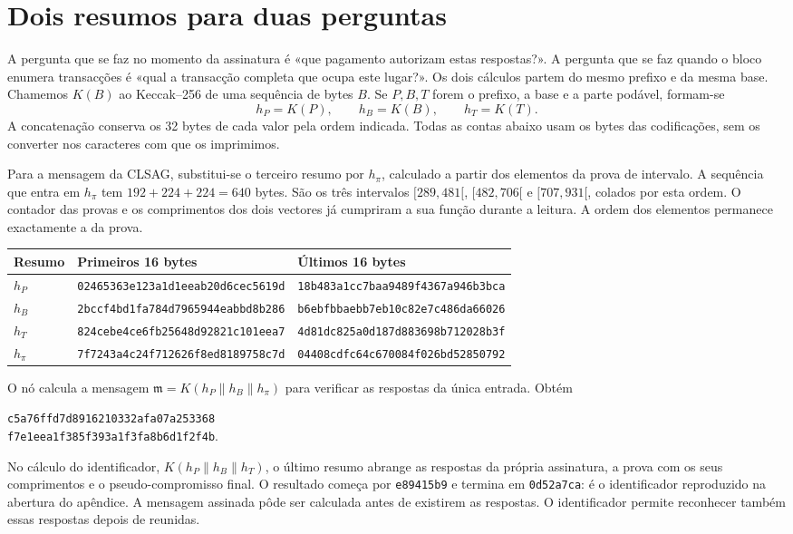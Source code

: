 \section{Dois resumos para duas perguntas}

A pergunta que se faz no momento da assinatura é «que pagamento
autorizam estas respostas?». A pergunta que se faz quando o bloco
enumera transacções é «qual a transacção completa que ocupa este
lugar?». Os dois cálculos partem do mesmo prefixo e da mesma base.
Chamemos \(K(B)\) ao Keccak--256 de uma sequência de bytes \(B\).
Se \(P,B,T\) forem o prefixo, a base e a parte podável, formam-se
\[
       h_P=K(P),\qquad h_B=K(B),\qquad h_T=K(T).
\]
A concatenação conserva os 32 bytes de cada valor pela ordem
indicada. Todas as contas abaixo usam os bytes das codificações,
sem os converter nos caracteres com que os imprimimos.

Para a mensagem da CLSAG, substitui-se o terceiro resumo por
\(h_\pi\), calculado a partir dos elementos da prova de intervalo.
A sequência que entra em \(h_\pi\) tem \(192+224+224=640\) bytes.
São os três intervalos \([289,481[\), \([482,706[\) e \([707,931[\),
colados por esta ordem. O contador das provas e os comprimentos dos
dois vectores já cumpriram a sua função durante a leitura. A ordem
dos elementos permanece exactamente a da prova.
\begin{center}\small
\begin{tabular}{@{}l@{\quad}l@{\enspace}l@{}}
\toprule
Resumo & Primeiros 16 bytes & Últimos 16 bytes\\
\midrule
\(h_P\) & \texttt{02465363e123a1d1eeab20d6cec5619d} & \texttt{18b483a1cc7baa9489f4367a946b3bca}\\
\(h_B\) & \texttt{2bccf4bd1fa784d7965944eabbd8b286} & \texttt{b6ebfbbaebb7eb10c82e7c486da66026}\\
\(h_T\) & \texttt{824cebe4ce6fb25648d92821c101eea7} & \texttt{4d81dc825a0d187d883698b712028b3f}\\
\(h_\pi\) & \texttt{7f7243a4c24f712626f8ed8189758c7d} & \texttt{04408cdfc64c670084f026bd52850792}\\
\bottomrule
\end{tabular}
\end{center}
O nó calcula a mensagem \(\mathfrak m=K(h_P\|h_B\|h_\pi)\) para
verificar as respostas da única entrada. Obtém
\begin{center}
\texttt{c5a76ffd7d8916210332afa07a253368}\\
\texttt{f7e1eea1f385f393a1f3fa8b6d1f2f4b}.
\end{center}
No cálculo do identificador, \(K(h_P\|h_B\|h_T)\), o último resumo
abrange as respostas da própria assinatura, a prova com os seus
comprimentos e o pseudo-compromisso final. O resultado começa por
\texttt{e89415b9} e termina em \texttt{0d52a7ca}: é o identificador
reproduzido na abertura do apêndice. A mensagem assinada pôde ser
calculada antes de existirem as respostas. O identificador permite
reconhecer também essas respostas depois de reunidas.

